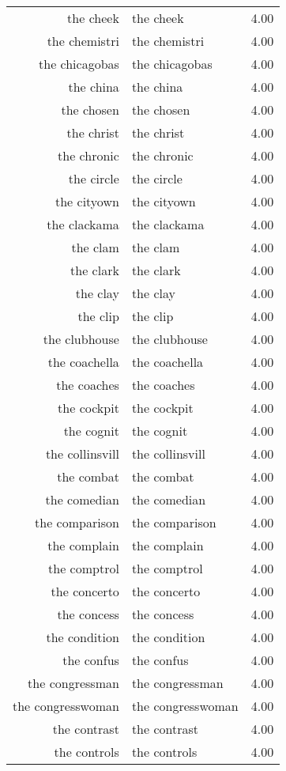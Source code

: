 \begin{table}[ht]
\begin{tabular}{rlr}
  the cheek & the cheek & 4.00 \\ 
  the chemistri & the chemistri & 4.00 \\ 
  the chicagobas & the chicagobas & 4.00 \\ 
  the china & the china & 4.00 \\ 
  the chosen & the chosen & 4.00 \\ 
  the christ & the christ & 4.00 \\ 
  the chronic & the chronic & 4.00 \\ 
  the circle & the circle & 4.00 \\ 
  the cityown & the cityown & 4.00 \\ 
  the clackama & the clackama & 4.00 \\ 
  the clam & the clam & 4.00 \\ 
  the clark & the clark & 4.00 \\ 
  the clay & the clay & 4.00 \\ 
  the clip & the clip & 4.00 \\ 
  the clubhouse & the clubhouse & 4.00 \\ 
  the coachella & the coachella & 4.00 \\ 
  the coaches & the coaches & 4.00 \\ 
  the cockpit & the cockpit & 4.00 \\ 
  the cognit & the cognit & 4.00 \\ 
  the collinsvill & the collinsvill & 4.00 \\ 
  the combat & the combat & 4.00 \\ 
  the comedian & the comedian & 4.00 \\ 
  the comparison & the comparison & 4.00 \\ 
  the complain & the complain & 4.00 \\ 
  the comptrol & the comptrol & 4.00 \\ 
  the concerto & the concerto & 4.00 \\ 
  the concess & the concess & 4.00 \\ 
  the condition & the condition & 4.00 \\ 
  the confus & the confus & 4.00 \\ 
  the congressman & the congressman & 4.00 \\ 
  the congresswoman & the congresswoman & 4.00 \\ 
  the contrast & the contrast & 4.00 \\ 
  the controls & the controls & 4.00 \\ 

\end{tabular}
\end{table}
